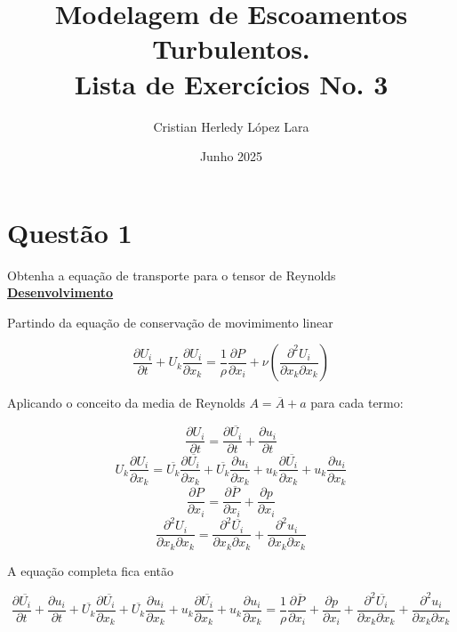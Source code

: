 \documentclass[12pt]{article}
\title{\textbf{Modelagem de Escoamentos Turbulentos. \\Lista de Exercícios No. 3}}
\author{Cristian Herledy López Lara}
\date{Junho 2025}
\begin{document}
	
\maketitle


\section*{Questão 1}

Obtenha a equação de transporte para o tensor de Reynolds\\


\textbf{\underline{Desenvolvimento}}

Partindo da equação de conservação de movimimento linear

\begin{equation}
	\frac{\partial U_i}{\partial t} + U_k \frac{\partial U_i}{\partial x_k} = \frac{1}{\rho} \frac{\partial P}{\partial x_i} + \nu \left( \frac{\partial ^ 2 U_i}{\partial x_k \partial x_k}\right) 
\end{equation}

Aplicando o conceito da media de Reynolds $A = \overline{A} + a$ para cada termo:

\begin{equation}
	\frac{\partial U_i}{\partial t} = \frac{\partial \overline{U_i} }{\partial t} + \frac{\partial u_i}{\partial t}
\end{equation}
\begin{equation}
	U_k \frac{\partial U_i}{\partial x_k} = \overline{U_k} \frac{\partial \overline{U_i}}{\partial x_k} + \overline{U_k} \frac{\partial u_i}{\partial x_k} + u_k \frac{\partial \overline{U_i}}{\partial x_k} + u_k \frac{\partial u_i}{\partial x_k} 
\end{equation}
\begin{equation}
	\frac{\partial P}{\partial x_i} = \frac{\partial \overline{P}}{\partial x_i} + \frac{\partial p}{\partial x_i}
\end{equation}
\begin{equation}
	\frac{\partial ^ 2 U_i}{\partial x_k \partial x_k} = \frac{\partial ^ 2 \overline{U_i}}{\partial x_k \partial x_k} +  \frac{\partial ^ 2 u_i}{\partial x_k \partial x_k}
\end{equation}

A equação completa fica então

\begin{equation}
	\frac{\partial \overline{U_i} }{\partial t} + \frac{\partial u_i}{\partial t} + \overline{U_k} \frac{\partial \overline{U_i}}{\partial x_k} + \overline{U_k} \frac{\partial u_i}{\partial x_k} + u_k \frac{\partial \overline{U_i}}{\partial x_k} + u_k \frac{\partial u_i}{\partial x_k} = \frac{1}{\rho} \frac{\partial \overline{P}}{\partial x_i} + \frac{\partial p}{\partial x_i} +  \frac{\partial ^ 2 \overline{U_i}}{\partial x_k \partial x_k} +  \frac{\partial ^ 2 u_i}{\partial x_k \partial x_k}
\end{equation}
\end{document}
